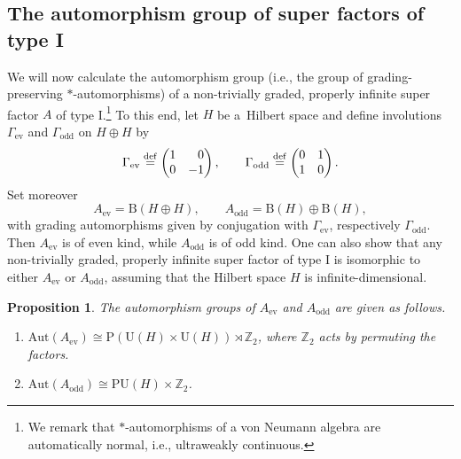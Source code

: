 \documentclass[10pt,a4paper]{amsart}
\numberwithin{equation}{section}
\newtheorem{Proposition}[Theorem]{Proposition}
\newcommand{\Z}{\mathbb{Z}}
\newcommand{\B}{\mathrm{B}}
\newcommand{\Aut}{\mathrm{Aut}}
\newcommand{\U}{\mathrm{U}}
\begin{document}
\subsection{The automorphism group of super factors of type I}

We will now calculate the automorphism group (i.e., the group of grading-preserving $*$-automor\-phisms) of a non-trivially graded, properly infinite super factor $A$ of type I.\footnote{We remark that $*$-automorphisms of a von Neumann algebra are automatically normal, i.e., ultraweakly continuous.}
To this end, let $H$ be a~Hilbert space and define involutions $\Gamma_{\mathrm{ev}}$ and $\Gamma_{\mathrm{odd}}$ on $H\oplus H$ by
\begin{equation} \label{GammaMatrices}
\Gamma_{\mathrm{ev}}  \stackrel{\mathrm{def}}{=}  \begin{pmatrix} 1 & \hphantom{-}0 \\ 0 & -1 \end{pmatrix}, \qquad
\Gamma_{\mathrm{odd}}  \stackrel{\mathrm{def}}{=}  \begin{pmatrix} 0 & 1 \\ 1 & 0 \end{pmatrix}.
\end{equation}
Set moreover
\begin{equation*}
 A_{\mathrm{ev}} = \B(H \oplus H), \qquad A_{\mathrm{odd}} = \B(H) \oplus \B(H),
\end{equation*}
with grading automorphisms given by conjugation with $\Gamma_{\mathrm{ev}}$, respectively $\Gamma_{\mathrm{odd}}$.
Then $A_{\mathrm{ev}}$ is of even kind, while $A_{\mathrm{odd}}$ is of odd kind.
One can also show that any non-trivially graded, properly infinite super factor of type I is isomorphic to either $A_{\mathrm{ev}}$ or $A_{\mathrm{odd}}$, assuming that the Hilbert space $H$ is infinite-dimensional.

\begin{Proposition} \label{PropositionAutomorphismGroups}
The automorphism groups of $A_{\mathrm{ev}}$ and $A_{\mathrm{odd}}$ are given as follows.
\begin{enumerate}\itemsep=0pt
\item[$(i)$] $\Aut(A_{\mathrm{ev}}) \cong \mathrm{P}(\U(H) \times \U(H)) \rtimes \Z_2$, where $\Z_2$ acts by permuting the factors.
\item[$(ii)$] $\Aut(A_{\mathrm{odd}}) \cong \mathrm{PU}(H) \times \Z_2$.
\end{enumerate}
\end{Proposition}
\end{document}
